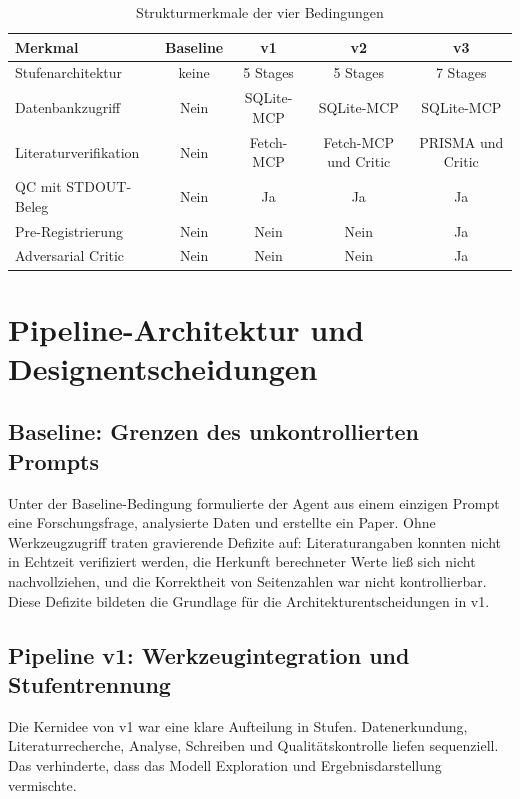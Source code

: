 \documentclass[11pt,a4paper]{article}
\begin{document}
\begin{table}[h]
\centering
\caption{Strukturmerkmale der vier Bedingungen}
\label{tab:design}
\small
\begin{tabular}{lcccc}
\toprule
\textbf{Merkmal} & \textbf{Baseline} & \textbf{v1} & \textbf{v2} & \textbf{v3} \\
\midrule
Stufenarchitektur & keine & 5 Stages & 5 Stages & 7 Stages \\
Datenbankzugriff & Nein & SQLite-MCP & SQLite-MCP & SQLite-MCP \\
Literaturverifikation & Nein & Fetch-MCP & Fetch-MCP und Critic & PRISMA und Critic \\
QC mit STDOUT-Beleg & Nein & Ja & Ja & Ja \\
Pre-Registrierung & Nein & Nein & Nein & Ja \\
Adversarial Critic & Nein & Nein & Nein & Ja \\
\bottomrule
\end{tabular}
\end{table}

\section{Pipeline-Architektur und Designentscheidungen}

\subsection{Baseline: Grenzen des unkontrollierten Prompts}

Unter der Baseline-Bedingung formulierte der Agent aus einem einzigen Prompt eine
Forschungsfrage, analysierte Daten und erstellte ein Paper. Ohne Werkzeugzugriff traten gravierende Defizite auf: Literaturangaben konnten nicht
in Echtzeit verifiziert werden, die Herkunft berechneter Werte ließ sich nicht
nachvollziehen, und die Korrektheit von Seitenzahlen war nicht kontrollierbar. Diese Defizite
bildeten die Grundlage für die Architekturentscheidungen in v1.

\subsection{Pipeline v1: Werkzeugintegration und Stufentrennung}

Die Kernidee von v1 war eine klare Aufteilung in Stufen. Datenerkundung,
Literaturrecherche, Analyse, Schreiben und Qualitätskontrolle liefen sequenziell.
Das verhinderte, dass das Modell Exploration und Ergebnisdarstellung vermischte.
\end{document}
